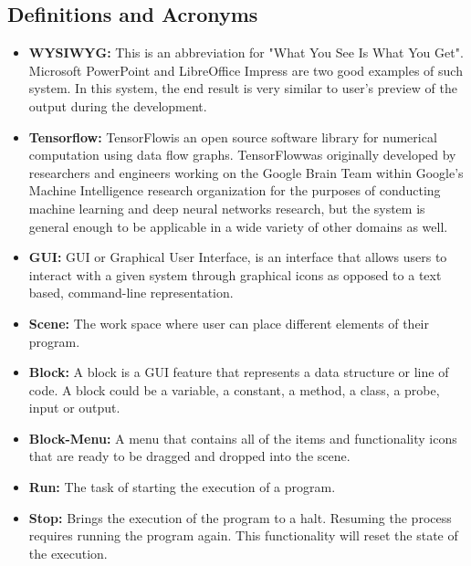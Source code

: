\documentclass[journal,10pt,onecolumn,compsoc]{IEEEtran} \usepackage[margin=1.0in]{geometry} \usepackage{pdfpages}
\begin{document}
\subsection{Definitions and Acronyms}
\begin{itemize}
	\item \textbf{WYSIWYG:}
		This is an abbreviation for "What You See Is What You Get".
		Microsoft PowerPoint and LibreOffice Impress are two good examples of such system. 
		In this system, the end result is very similar to user's preview of the output during the development.\\
	\item \textbf{Tensorflow\texttrademark:}
		TensorFlow\texttrademark is an open source software library for numerical computation using data flow graphs.
		TensorFlow\texttrademark was originally developed by researchers and engineers working on the Google Brain Team within Google's Machine Intelligence research organization for the purposes of 
		conducting machine learning and deep neural networks research, but the system is general enough to be applicable in a wide variety of other domains as well.\\
	\item \textbf{GUI:}
		GUI or Graphical User Interface, is an interface that allows users to interact with a given system through graphical icons as opposed to a text based, command-line representation.\\
	\item \textbf{Scene:}
		The work space where user can place different elements of their program.\\
	\item \textbf{Block:}
		A block is a GUI feature that represents a data structure or line of code. A block could be a variable, a constant, a method, a class, a probe, input or output.\\
	\item \textbf{Block-Menu:}
		A menu that contains all of the items and functionality icons that are ready to be dragged and dropped into the scene.\\
	\item \textbf{Run:}
		The task of starting the execution of a program.\\
	\item \textbf{Stop:}
		Brings the execution of the program to a halt. Resuming the process requires running the program again.
		This functionality will reset the state of the execution.\\

\end{itemize}
\end{document}
